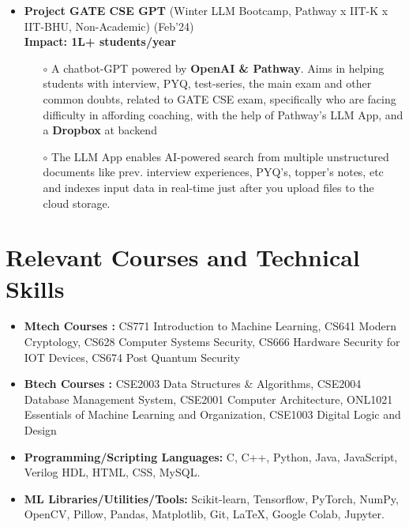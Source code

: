 \documentclass[10.8pt, a4paper]{extarticle}
\newcommand{\shorterSection}[1]{\vspace{-10pt}\section{#1}}
\begin{document}
\begin{itemize}
  \item \textbf{Project GATE CSE GPT} (Winter LLM Bootcamp, Pathway x IIT-K x IIT-BHU, Non-Academic) \href{https://github.com/souvikcseiitk/gate_cse_gpt}{\faGithub{}} \hfill(Feb'24) \\
         \textbf{Impact: 1L+ students/year} \\
         
	\begin{itemize}
 
        \item[$\circ$] A chatbot-GPT powered by \textbf{OpenAI \& Pathway}. Aims in helping students with interview, PYQ, test-series, the main exam and other common doubts, related to GATE CSE exam, specifically who are facing difficulty in affording coaching, with the help of Pathway's LLM App, and a \textbf{Dropbox} at backend\\[-0.6cm]
        
        \item[$\circ$] The LLM App enables AI-powered search from multiple unstructured documents like prev. interview experiences, PYQ's, topper's notes, etc and indexes input data in real-time just after you upload files to the cloud storage.\\[-0.6cm]


 
	

	\end{itemize}
\end{itemize}

\medskip
\vspace{-2mm}


\shorterSection{Relevant Courses and Technical Skills}
\begin{itemize}
\item \textbf{Mtech Courses :} CS771 Introduction to Machine Learning, CS641 Modern Cryptology, CS628 Computer Systems Security, CS666 Hardware Security for IOT Devices, CS674 Post Quantum Security  \\[-0.6cm]
\item \textbf{Btech Courses :} CSE2003 Data Structures \& Algorithms, CSE2004 Database Management System, CSE2001 Computer Architecture, ONL1021 Essentials of Machine Learning and Organization, CSE1003 Digital Logic and Design   \\[-0.6cm]
\item \textbf{Programming/Scripting Languages:} C, C++, Python, Java, JavaScript, Verilog HDL, HTML, CSS, MySQL.  \\[-0.6cm]
\item \textbf{ML Libraries/Utilities/Tools:} Scikit-learn, Tensorflow, PyTorch, NumPy, OpenCV, Pillow, Pandas, Matplotlib, Git, \LaTeX, Google Colab, Jupyter.  \\[-0.6cm]
 \medskip
\end{itemize}
\end{document}
